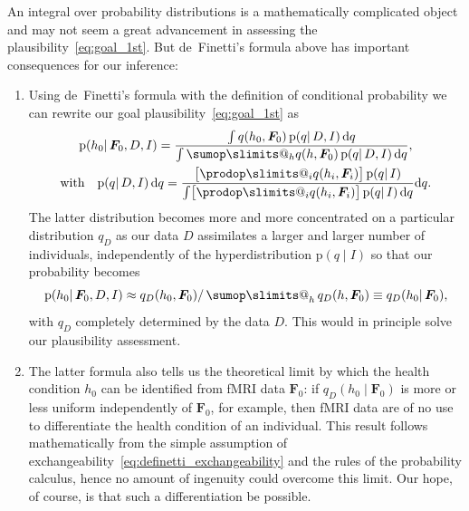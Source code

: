 \documentclass[\ifafour a4paper,12pt,\else a5paper,10pt,\fi%
onecolumn,oneside,article,%
british%
]{memoir}
\makeatletter
\theoremstyle{remark}
\theoremstyle{innote}
\def\sum{\DOTSI\sumop\slimits@}
\def\prod{\DOTSI\prodop\slimits@}
\newcommand*{\di}{\mathrm{d}}%
\newcommand*{\pf}{\mathrm{p}}%
\renewcommand*{\|}{\mathpunct{|}}
\newcommand*{\tsum}{\mathop{\textstyle\sum}\nolimits}
\newcommand*{\yH}{h}
\newcommand*{\yD}{D}
\newcommand*{\yF}{\bm{F}}
\newcommand*{\yp}{q}
\newcommand*{\ypc}{\yp_{\yD}}
\newcommand*{\yI}{I}
\theoremstyle{plain}
\makeatother
\begin{document}
An integral over probability distributions is a mathematically complicated
object and may not seem a great advancement in assessing the
plausibility~\eqref{eq:goal_1st}. But de~Finetti's formula above has
important consequences for our inference:
\begin{enumerate}[wide]
\item Using de~Finetti's formula with the definition of conditional
  probability we can rewrite our goal plausibility~\eqref{eq:goal_1st} as
\begin{equation}\label{eq:goal_1st_exchangeability}
\begin{gathered}
    \pf(\yH_0 \| \yF_0, \yD, \yI) =
    \frac{
      \int \yp(\yH_0,\yF_0)\,
      \pf(\yp \|\yD,\yI) \,\di\yp
    }{
      \int \sum_{\yH}\yp(\yH,\yF_0)\,
      \pf(\yp \|\yD,\yI) \,\di\yp },
    \\ \text{with} \quad \pf(\yp \|\yD,\yI) \,\di\yp =
    \frac{ \bigl[ \prod_i \yp(\yH_i,\yF_i) \bigr]\,
      \pf(\yp \|\yI)
    }{
      \int \bigl[ \prod_i \yp(\yH_i,\yF_i) \bigr]\,
      \pf(\yp \|\yI) \,\di\yp }\di\yp.
\end{gathered}
\end{equation}
The latter distribution becomes more and more concentrated on a particular
distribution $\ypc$ as our data $\yD$ assimilates a larger and larger number
of individuals, independently of the hyperdistribution $\pf(\yp \|\yI)$ so
that our probability becomes
\begin{equation}
  \label{eq:goal_1st_limit}
  \pf(\yH_0 \| \yF_0, \yD, \yI) \approx
  \ypc(\yH_0,\yF_0) / \tsum_{\yH}\ypc(\yH,\yF_0)
  \equiv \ypc(\yH_0\|\yF_0),
\end{equation}
with $\ypc$ completely determined by the data $\yD$. This would in
principle solve our plausibility assessment.
\item The latter formula also tells us the theoretical limit by which the
  health condition $\yH_0$ can be identified from fMRI data $\yF_0$: if
  $\ypc(\yH_0\|\yF_0)$ is more or less uniform independently of $\yF_0$,
  for example, then fMRI data are of no use to differentiate the
  health condition of an individual. This result follows mathematically
  from the simple assumption of
  exchangeability~\eqref{eq:definetti_exchangeability} and the rules of the
  probability calculus, hence no amount of ingenuity could overcome this
  limit. Our hope, of course, is that such a differentiation be possible.
\end{enumerate}

\medskip
\end{document}
